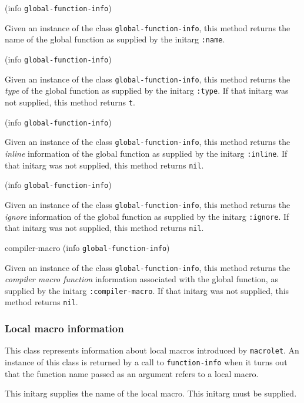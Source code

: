  {(info {\tt global-function-info})}

Given an instance of the class \texttt{global-function-info}, this
method returns the name of the global function as supplied by the
initarg \texttt{:name}.

 {(info {\tt global-function-info})}

Given an instance of the class \texttt{global-function-info}, this
method returns the \emph{type} of the global function as supplied by the
initarg \texttt{:type}.  If that initarg was not supplied, this method
returns \texttt{t}.

 {(info {\tt global-function-info})}

Given an instance of the class \texttt{global-function-info}, this
method returns the \emph{inline} information of the global function as
supplied by the initarg \texttt{:inline}.  If that initarg was not
supplied, this method returns \texttt{nil}.

 {(info {\tt global-function-info})}

Given an instance of the class \texttt{global-function-info}, this
method returns the \emph{ignore} information of the global function as
supplied by the initarg \texttt{:ignore}.  If that initarg was not
supplied, this method returns \texttt{nil}.

\Defmethod compiler-macro {(info {\tt global-function-info})}

Given an instance of the class \texttt{global-function-info}, this
method returns the \emph{compiler macro function} information
associated with the global function, as supplied by the initarg
\texttt{:compiler-macro}.  If that initarg was not supplied, this
method returns \texttt{nil}.

\subsubsection{Local macro information}


This class represents information about local macros introduced by
\texttt{macrolet}.  An instance of this class is returned by a call to
\texttt{function-info} when it turns out that the function name passed
as an argument refers to a local macro.


This initarg supplies the name of the local macro.  This initarg
must be supplied.

